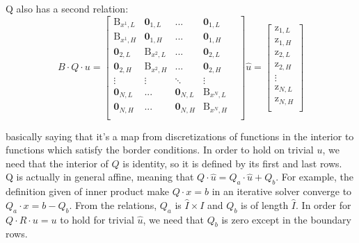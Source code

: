 \documentclass[11pt]{article}
\begin{document}
\begin{itemize}
		Q also has a second relation: 
		\begin{equation}
		B\cdot Q\cdot u  = 
		\begin{bmatrix}
		\text{B}_{x^{1},L} & \mathbf{0}_{1,L}       & ...    & \mathbf{0}_{1,L}\\
		\text{B}_{x^{1},H} & \mathbf{0}_{1,H}       & ...    & \mathbf{0}_{1,H}\\
		\mathbf{0}_{2,L}   & \text{B}_{x^{2},L} &   ...    & \mathbf{0}_{2,L}\\
		\mathbf{0}_{2,H}   & \text{B}_{x^{2},H} &   ...    & \mathbf{0}_{2,H}\\
		\vdots  & \vdots  & \ddots & \vdots \\
		\mathbf{0}_{N,L}       & ...    & \mathbf{0}_{N,L} & \text{B}_{x^{N},L} & \\
		\mathbf{0}_{N,H}       & ...    & \mathbf{0}_{N,H} & \text{B}_{x^{N},H} & \\
		\end{bmatrix}
		\hat{u}
		=
		\begin{bmatrix}
		\text{z}_{{1},L}\\
		\text{z}_{{1},H}\\
		\text{z}_{{2},L}\\
		\text{z}_{{2},H}\\
		\vdots\\
		\text{z}_{{N},L}\\
		\text{z}_{{N},H}\\
		\end{bmatrix}
		\label{Q_operator_2}
		\end{equation}
		
		basically saying that it's a map from discretizations of functions in the interior to functions which satisfy the border conditions. In order to hold on trivial $u$, we need that the interior of $Q$ is identity, so it is defined by its first and last rows.\\
		Q is actually in general affine, meaning that $Q\cdot \hat{u} = Q_a\cdot \hat{u} + Q_b$. For example, the definition given of inner product make $Q\cdot x=b$ in an iterative solver converge to $Q_a\cdot x = b - Q_b$. From the relations, $Q_a$ is $\hat{I}\times I$ and $Q_b$ is of length $\hat{I}$. In order for $Q\cdot R\cdot u = u$ to hold for trivial $\hat{u}$, we need that $Q_b$ is zero except in the boundary rows.
		

\end{itemize}
\end{document}
